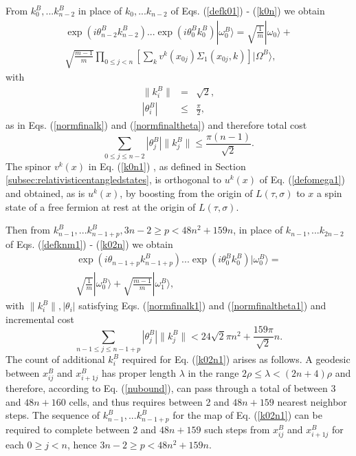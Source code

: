 \documentclass[12pt,amsmath,amssymb,onecolumn]{revtex4-2}
\begin{document}
From $k^B_0, ... k^B_{n-2}$ in place of $k_0, ... k_{n-2}$ of Eqs. (\ref{defk01}) - (\ref{k0n})
we obtain
\begin{multline}
\label{k0n1}
\exp( i \theta^B_{n-2} k^B_{n-2}) ... \exp( i \theta_0 ^Bk^B_0) |\omega^B_0 \rangle  = 
\sqrt{\frac{1}{m}} |\omega_0 \rangle  + \\
\sqrt{\frac{m - 1}{m}} \prod_{0 \le j < n} [\sum_k v^k(x_{0j}) \Sigma _1( x_{0j}, k)] |\Omega^B \rangle ,
\end{multline}
with
\begin{subequations}
\begin{eqnarray}
\label{normfinalk1}
\parallel k_i^B \parallel & = & \sqrt{2},\\
\label{normfinaltheta1}
| \theta_i^B | & \le & \frac{\pi}{2},
\end{eqnarray}
\end{subequations}
as in Eqs. (\ref{normfinalk}) and
(\ref{normfinaltheta}) and therefore total cost
\begin{equation}
  \label{kbcost}
  \sum_{0 \le j \le n - 2} |\theta^B_j| \parallel k^B_j \parallel \le \frac{ \pi (n - 1)}{\sqrt{2}}.
\end{equation}
The spinor $v^k(x)$ in Eq. (\ref{k0n1}) ,
as defined in Section \ref{subsec:relativisticentangledstates},
is orthogonal to $u^k(x)$ of Eq. (\ref{defomega1})
and obtained, as is $u^k(x)$, by boosting from the
origin of $L( \tau, \sigma)$ to $x$
a spin state of a free fermion at rest at
the origin of $L( \tau, \sigma)$.


Then from $k^B_{n-1}, ... k^B_{n - 1 +p}, 3n - 2 \ge p < 48 n^2 + 159 n$,
in place of
$k_{n-1}, ... k_{2n-2}$ of
Eqs. (\ref{defknm1}) - (\ref{k02n}) we obtain
\begin{multline}
\label{k02n1}
\exp( i \theta_{n-1 + p} k^B_{n-1 + p}) ... \exp( i \theta_0 ^Bk^B_0) |\omega^B_0 \rangle  = \\
\sqrt{\frac{1}{m}} |\omega^B_0 \rangle  +
\sqrt{\frac{m -1}{m}} |\omega^B_1 \rangle ,
\end{multline}
with $\parallel k^B_i \parallel, |\theta_i|$ satisfying Eqs. (\ref{normfinalk1}) and
(\ref{normfinaltheta1})
and incremental cost
\begin{equation}
  \label{kbcost1}
  \sum_{n-1\le j \le n - 1 +p} |\theta^B_j| \parallel k^B_j \parallel < 24 \sqrt{2} \pi n^2 + \frac{159 \pi}{\sqrt{2}} n.
\end{equation}
The count of additional $k^B_i$ required for Eq. (\ref{k02n1}) arises as follows.
A geodesic between $x^B_{ij}$ and $x^B_{i+1j}$ has proper length $\lambda$ in the range $2 \rho \le \lambda < (2 n + 4) \rho$
and therefore, according to Eq. (\ref{nubound}), can pass through a total of between 3
and $48 n + 160$ cells, and thus requires between 2 and $48 n + 159$
nearest neighbor steps. The sequence of $k^B_{n-1}, ... k^B_{n - 1 +p}$
for the map of Eq. (\ref{k02n1})
can be required to complete between 2 and $48 n + 159$ such steps from $x^B_{ij}$ and $x^B_{i+1j}$
for each $0 \ge j < n$, hence $3n - 2 \ge p < 48 n^2 + 159 n$.
\end{document}
